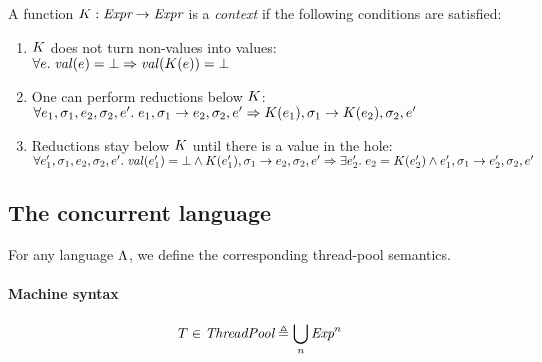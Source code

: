 \begin{defn}[Context]
  A function $K : \textit{Expr} \to \textit{Expr}$ is a \emph{context} if the following conditions are satisfied:
  \begin{enumerate}
  \item $K$ does not turn non-values into values:\\
    $\All\expr. \toval(\expr) = \bot \Ra \toval(\lctx(\expr)) = \bot $
  \item One can perform reductions below $K$:\\
    $\All \expr_1, \state_1, \expr_2, \state_2, \expr'. \expr_1, \state_1 \step \expr_2,\state_2,\expr' \Ra \lctx(\expr_1), \state_1 \step \lctx(\expr_2),\state_2,\expr' $
  \item Reductions stay below $K$ until there is a value in the hole:\\
    $\All \expr_1', \state_1, \expr_2, \state_2, \expr'. \toval(\expr_1') = \bot \land \lctx(\expr_1'), \state_1 \step \expr_2,\state_2,\expr' \Ra \Exists\expr_2'. \expr_2 = \lctx(\expr_2') \land \expr_1', \state_1 \step \expr_2',\state_2,\expr' $
  \end{enumerate}
\end{defn}

\subsection{The concurrent language}

For any language $\Lambda$, we define the corresponding thread-pool semantics.

\paragraph{Machine syntax}
\[
	T \in \textit{ThreadPool} \triangleq \bigcup_n \textit{Exp}^n
\]

 {\cfg{\tpool}{\state} \step
  }

\clearpage

